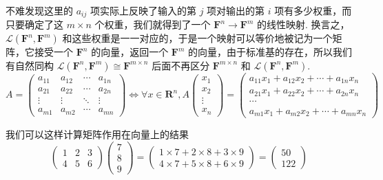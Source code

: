 不难发现这里的 $a_{ij}$ 项实际上反映了输入的第 $j$ 项对输出的第 $i$ 项有多少权重，而只要确定了这 $m\times n$ 个权重，我们就得到了一个 $\mathbf{F}^n\to\mathbf{F}^m$ 的线性映射. 换言之，$\mathcal{L}(\mathbf{F}^n, \mathbf{F}^m)$ 和这些权重是一一对应的，于是一个映射可以等价地被记为一个矩阵，它接受一个 $\mathbf{F}^n$ 的向量，返回一个 $\mathbf{F}^m$ 的向量，由于标准基的存在，所以我们有自然同构 $\mathcal{L}(\mathbf{F}^n, \mathbf{F}^m) \cong \mathbf{F}^{m\times n}$ 后面不再区分 $\mathbf{F}^{m\times n}$ 和 $\mathcal{L}(\mathbf{F}^n, \mathbf{F}^m)$.
\[
    A = \begin{pmatrix}
        a_{11} & a_{12} & \cdots & a_{1n} \\
        a_{21} & a_{22} & \cdots & a_{2n} \\
        \vdots & \vdots & \ddots & \vdots \\
        a_{m1} & a_{m2} & \cdots & a_{mn}
    \end{pmatrix} \iff \forall x\in\mathbf{R}^n,
    A \begin{pmatrix}
        x_1 \\ x_2 \\ \vdots \\ x_n
    \end{pmatrix} = \begin{pmatrix}
        a_{11} x_1 + a_{12} x_2 + \cdots + a_{1n} x_n \\
        a_{21} x_1 + a_{22} x_2 + \cdots + a_{2n} x_n \\
        \cdots\\
        a_{m1} x_1 + a_{m2} x_2 + \cdots + a_{mn} x_n
    \end{pmatrix}
\]

我们可以这样计算矩阵作用在向量上的结果
\[
    \begin{pmatrix}
        1 & 2 & 3 \\ 4 & 5 & 6
    \end{pmatrix} \begin{pmatrix}
        7 \\ 8 \\ 9
    \end{pmatrix} = \begin{pmatrix}
        1\times 7 + 2\times 8 + 3\times 9 \\
        4 \times 7 + 5\times 8 + 6\times 9
    \end{pmatrix} = \begin{pmatrix}
        50 \\ 122
    \end{pmatrix}
\]

